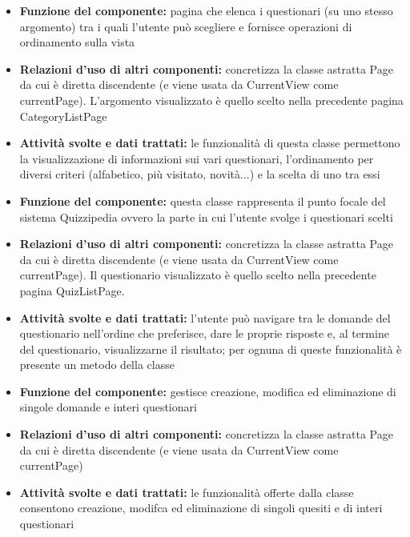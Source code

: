 \documentclass[a4paper,11pt]{article}
\begin{document}
			\begin{itemize}
		    \item\textbf{Funzione del componente:} pagina che elenca i questionari (su uno stesso argomento) tra i quali l'utente può scegliere e fornisce operazioni di ordinamento sulla vista
			\item\textbf{Relazioni d'uso di altri componenti:} concretizza la classe astratta Page da cui è diretta discendente (e viene usata da CurrentView come currentPage). L'argomento visualizzato è quello scelto nella precedente pagina CategoryListPage
			\item\textbf{Attività svolte e dati trattati:} le funzionalità di questa classe permettono la visualizzazione di informazioni sui vari questionari, l'ordinamento per diversi criteri (alfabetico, più visitato, novità...) e la scelta di uno tra essi
			\end{itemize}
			\begin{itemize}
		    \item\textbf{Funzione del componente:} questa classe rappresenta il punto focale del sistema Quizzipedia ovvero la parte in cui l'utente svolge i questionari scelti
			\item\textbf{Relazioni d'uso di altri componenti:} concretizza la classe astratta Page da cui è diretta discendente (e viene usata da CurrentView come currentPage). Il questionario visualizzato è quello scelto nella precedente pagina QuizListPage.
			\item\textbf{Attività svolte e dati trattati:} l'utente può navigare tra le domande del questionario nell'ordine che preferisce, dare le proprie risposte e, al termine del questionario, visualizzarne il risultato; per ognuna di queste funzionalità è presente un metodo della classe
			\end{itemize}
			\begin{itemize}
		    \item\textbf{Funzione del componente:} gestisce creazione, modifica ed eliminazione di singole domande e interi questionari
			\item\textbf{Relazioni d'uso di altri componenti:} concretizza la classe astratta Page da cui è diretta discendente (e viene usata da CurrentView come currentPage)
			\item\textbf{Attività svolte e dati trattati:} le funzionalità offerte dalla classe consentono creazione, modifca ed eliminazione di singoli quesiti e di interi questionari
			\end{itemize}
\end{document}
